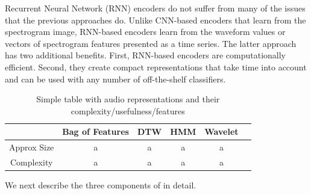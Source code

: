 Recurrent Neural Network (RNN) encoders do not suffer from many of the issues that 
the previous approaches do.
Unlike CNN-based encoders that learn from the spectrogram image,
RNN-based encoders learn from the waveform values or vectors of spectrogram
features presented as a time series.
The latter approach has two additional benefits.
First, RNN-based encoders are computationally efficient.
Second, they create compact representations that take time into account 
and can be used with any number of off-the-shelf classifiers.

\begin{table}[t]
    \centering
    \begin{tabular}{cccccc}
                & Bag of Features & DTW & HMM & Wavelet  \\ \hline
    Approx Size & a & a & a & a \\
    Complexity  & a & a & a & a
    \end{tabular}
    \caption{Simple table with audio representations and their complexity/usefulness/features}
    \label{tab:audioreps}
\end{table}

We next describe the three components of \sys in detail.
